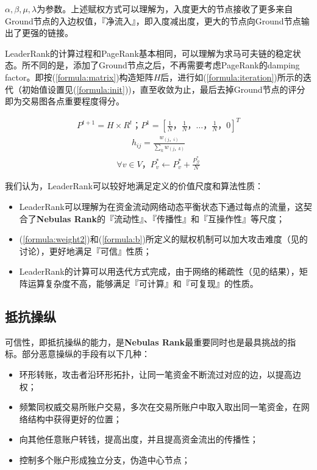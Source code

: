 $\alpha, \beta, \mu, \lambda$为参数。上述赋权方式可以理解为，入度更大的节点接收了更多来自Ground节点的入边权值，『净流入』，即入度减出度，更大的节点向Ground节点输出了更强的链接。

LeaderRank的计算过程和PageRank基本相同，可以理解为求马可夫链的稳定状态。所不同的是，添加了Ground节点之后，不再需要考虑PageRank的damping factor\cite{Brin2010}\cite{page1999pagerank}。即按(\ref{formula:matrix})构造矩阵$H$后，进行如(\ref{formula:iteration})所示的迭代（初始值设置见(\ref{formula:init}))，直至收敛为止，最后去掉Ground节点的评分即为交易图各点重要程度得分。

\begin{align} \label{formula:iteration}
	P^{t+1} = H \times R^{t}； P^1=[\frac{1}{N}， \frac{1}{N}， \dots， \frac{1}{N}， 0]^T
\end{align}
\begin{align} \label{formula:matrix}
	h_{ij} = \frac{w_{(j，i)}}{\sum_k w_{(j，k)}}
\end{align}
\begin{align} \label{formula:init}
\forall v \in V， P^*_v \leftarrow P^*_v + \frac{P^*_{\mathcal{G}}}{N}
\end{align}


我们认为，LeaderRank可以较好地满足定义的价值尺度和算法性质：
\begin{itemize}
	\item LeaderRank可以理解为在资金流动网络动态平衡状态下通过每点的流量，这契合了\textbf{Nebulas Rank}的『流动性』、『传播性』和『互操作性』等尺度；
	\item (\ref{formula:weight2})和(\ref{formula:b})所定义的赋权机制可以加大攻击难度（见的讨论），更好地满足『可信』性质；
	\item LeaderRank的计算可以用迭代方式完成，由于网络的稀疏性（见的结果），矩阵运算复杂度不高，能够满足『可计算』和『可复现』的性质。
\end{itemize}


\subsection{抵抗操纵}\label{subsec:robust}

可信性，即抵抗操纵的能力，是\textbf{Nebulas Rank}最重要同时也是最具挑战的指标。部分恶意操纵的手段有以下几种：
\begin{itemize}
	\item 环形转账，攻击者沿环形拓扑，让同一笔资金不断流过对应的边，以提高边权；
	\item 频繁同权威交易所账户交易，多次在交易所账户中取入取出同一笔资金，在网络结构中获得更好的位置；
	\item 向其他任意账户转钱，提高出度，并且提高资金流出的传播性；
	\item 控制多个账户形成独立分支，伪造中心节点；
\end{itemize}

